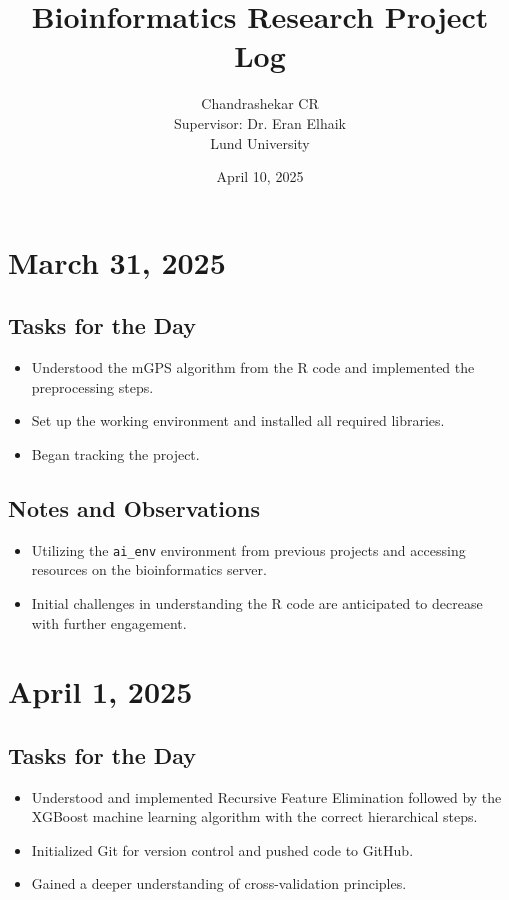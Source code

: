 \documentclass{article}
\title{\textbf{Bioinformatics Research Project Log}}
\author{Chandrashekar CR \\ Supervisor: Dr. Eran Elhaik \\ Lund University}
\date{April 10, 2025}
\begin{document}
\maketitle
\tableofcontents
\newpage

\section{March 31, 2025}

\subsection*{Tasks for the Day}
\begin{itemize}
    \item Understood the mGPS algorithm from the R code and implemented the preprocessing steps.
    \item Set up the working environment and installed all required libraries.
    \item Began tracking the project.
\end{itemize}

\subsection*{Notes and Observations}
\begin{itemize}
    \item Utilizing the \texttt{ai\_env} environment from previous projects and accessing resources on the bioinformatics server.
    \item Initial challenges in understanding the R code are anticipated to decrease with further engagement.
\end{itemize}

\section{April 1, 2025}

\subsection*{Tasks for the Day}
\begin{itemize}
    \item Understood and implemented Recursive Feature Elimination followed by the XGBoost machine learning algorithm with the correct hierarchical steps.
    \item Initialized Git for version control and pushed code to GitHub.
    \item Gained a deeper understanding of cross-validation principles.
\end{itemize}
\end{document}
